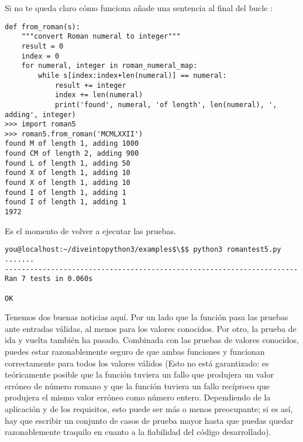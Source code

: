 Si no te queda claro cómo funciona  añade una sentencia  al final del bucle :

\noindent\begin{minipage}{\textwidth}
\begin{lstlisting}[mathescape=True]
def from_roman(s):
    """convert Roman numeral to integer"""
    result = 0
    index = 0
    for numeral, integer in roman_numeral_map:
        while s[index:index+len(numeral)] == numeral:
            result += integer
            index += len(numeral)
            print('found', numeral, 'of length', len(numeral), ', adding', integer)
>>> import roman5
>>> roman5.from_roman('MCMLXXII')
found M of length 1, adding 1000
found CM of length 2, adding 900
found L of length 1, adding 50
found X of length 1, adding 10
found X of length 1, adding 10
found I of length 1, adding 1
found I of length 1, adding 1
1972
\end{lstlisting}
\end{minipage}

Es el momento de volver a ejecutar las pruebas.

\noindent\begin{minipage}{\textwidth}
\begin{lstlisting}[mathescape=True]
you@localhost:~/diveintopython3/examples$\$$ python3 romantest5.py
.......
----------------------------------------------------------------------
Ran 7 tests in 0.060s

OK
\end{lstlisting}
\end{minipage}

Tenemos dos buenas noticias aquí. Por un lado que la función  pasa las pruebas ante entradas válidas, al menos para los valores conocidos. Por otro, la prueba de ida y vuelta también ha pasado. Combinada con las pruebas de valores conocidos, puedes estar razonablemente seguro de que ambas funciones  y  funcionan correctamente para todos los valores válidos (Esto no está garantizado: es teóricamente posible que la función  tuviera un fallo que produjera un valor erróneo de número romano y que la función  tuviera un fallo recíproco que produjera el mismo valor erróneo como número entero. Dependiendo de la aplicación y de los requisitos, esto puede ser más o menos preocupante; si es así, hay que escribir un conjunto de casos de prueba mayor hasta que puedas quedar razonablemente traquilo en cuanto a la fiabilidad del código desarrollado).

